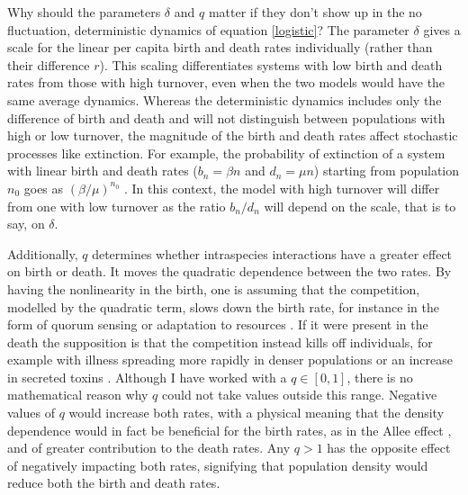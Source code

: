 Why should the parameters $\delta$ and $q$ matter if they don't show up in the no fluctuation, deterministic dynamics of equation \ref{logistic}? 
The parameter $\delta$ gives a scale for the linear per capita birth and death rates individually (rather than their difference $r$).
This scaling differentiates systems with low birth and death rates from those with high turnover, even when the two models would have the same average dynamics. 
Whereas the deterministic dynamics includes only the difference of birth and death and will not distinguish between populations with high or low turnover, the magnitude of the birth and death rates affect stochastic processes like extinction. 
For example, the probability of extinction of a system with linear birth and death rates ($b_n=\beta n$ and $d_n=\mu n$) starting from population $n_0$ goes as $(\beta/\mu)^{n_0}$ \cite{Nisbet1982}.
In this context, the model with high turnover will differ from one with low turnover as the ratio $b_n/d_n$ will depend on the scale, that is to say, on $\delta$. 

Additionally, $q$ determines whether intraspecies interactions have a greater effect on birth or death. 
It moves the quadratic dependence between the two rates. 
By having the nonlinearity in the birth, one is assuming that the competition, modelled by the quadratic term, slows down the birth rate, for instance in the form of quorum sensing \cite{Nadell2008} or adaptation to resources \cite{Vulic2001}. 
If it were present in the death the supposition is that the competition instead kills off individuals, for example with illness spreading more rapidly in denser populations \cite{Greenhalgh1990} or an increase in secreted toxins \cite{VanMelderen2009,Rankin2012}.
Although I have worked with a $q \in [0,1]$, there is no mathematical reason why $q$ could not take values outside this range. 
Negative values of $q$ would increase both rates, with a physical meaning that the density dependence would in fact be beneficial for the birth rates, as in the Allee effect \cite{Chesson2000,Assaf2016}, and of greater contribution to the death rates. 
Any $q>1$ has the opposite effect of negatively impacting both rates, signifying that population density would reduce both the birth and death rates. %


